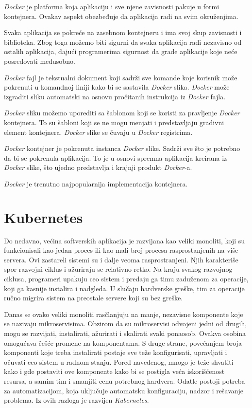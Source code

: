 \textit{Docker} je platforma koja aplikaciju i sve njene zavisnosti pakuje u formi kontejnera. 
Ovakav aspekt obezbeđuje da aplikacija radi na svim okruženjima.

Svaka aplikacija se pokreće na zasebnom kontejneru i ima svoj skup zavisnosti i biblioteka. 
Zbog toga možemo biti sigurni da svaka aplikacija radi nezavisno od ostalih aplikacija, 
dajući programerima sigurnost da grade aplikacije koje neće posredovati međusobno.

\textit{Docker} fajl je tekstualni dokument koji sadrži sve komande koje korisnik može pokrenuti 
u komandnoj liniji kako bi se sastavila \textit{Docker} slika. \textit{Docker} može izgraditi sliku automatski 
na osnovu pročitanih instrukcija iz \textit{Docker} fajla.

\textit{Docker} sliku možemo uporediti sa šablonom koji se koristi za pravljenje \textit{Docker} kontejnera. 
To su šabloni koji se ne mogu menjati i predstavljaju gradivni element kontejnera.
\textit{Docker} slike se čuvaju u \textit{Docker} registrima. 

\textit{Docker} kontejner je pokrenuta instanca \textit{Docker} slike. Sadrži sve što je potrebno da bi se 
pokrenula aplikacija. To je u osnovi spremna aplikacija kreirana iz \textit{Docker} slike, 
što ujedno predstavlja i krajnji produkt \textit{Docker}-a.~\cite{docker}

\textit{Docker} je trenutno najpopularnija implementacija kontejnera.

\section{Kubernetes}\label{sec:kubernetes}

Do nedavno, većina softverskih aplikacija je razvijana kao veliki monoliti, koji su funkcionisali kao jedan proces 
ili kao mali broj procesa rasprostanjenih na više servera. Ovi zastareli sistemi su i dalje veoma rasprostranjeni. 
Njih karakteriše spor razvojni ciklus i ažuriraju se relativno retko. Na kraju svakog razvojnog ciklusa, programeri
upakuju ceo sistem i predaju ga timu zaduženom za operacije, koji ga kasnije instalira i nadgleda. U slučaju hardverske
greške, tim za operacije ručno migrira sistem na preostale servere koji su bez greške.

Danas se ovako veliki monoliti rasčlanjuju na manje, nezavisne komponente koje se nazivaju mikroservisima. Obzirom
da su mikroservisi odvojeni jedni od drugih, mogu se razvijati, instalirati, ažurirati i skalirati svaki ponaosob.
Ovakva osobina omogućava češće promene na komponentama. S druge strane, povećanjem broja komponenti koje treba 
instalirati postaje sve teže konfigurisati, upravljati i očuvati ceo sistem u radnom stanju. Pored navedenog, mnogo 
je teže shvatiti kako i gde postaviti ove komponente kako bi se postigla veća iskorišćenost resursa, a samim tim i 
smanjiti cenu potrebnog hardvera. Odatle postoji potreba za automatizacijom, koja uključuje automatsku konfiguraciju,
nadzor  i rešavanje problema. Iz ovih razloga je razvijen \textit{Kubernetes}.


